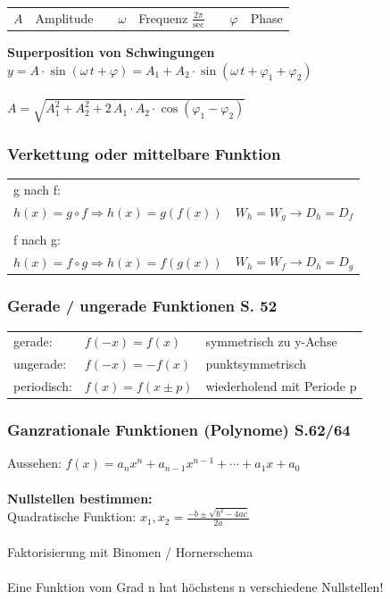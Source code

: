 			\begin{tabular}{llllllll}
				$A$ & Amplitude & & $\omega$ & Frequenz $\frac{2 \pi}{\mathrm{sec}}$ & & $\varphi$ & Phase \\
			\end{tabular}			
			
			\textbf{Superposition von Schwingungen} \\
			$y = A \cdot \sin(\omega \, t + \varphi)  =  A_1 + A_2 \cdot \sin(\omega \, t + \varphi_1 + \varphi_2)$\\ 
			\\
			$A = \sqrt{A_1^2 + A_2^2 + 2 \,A_1 \cdot A_2 \cdot \cos(\varphi_1 - \varphi_2)}$
			
		\subsubsection{Verkettung oder mittelbare Funktion}
			\begin{tabular}{ll} %
				g nach f: & \\
				$h(x)=g \circ f \Rightarrow h(x)=g(f(x))$ & $W_h=W_g \rightarrow D_h=D_f$ \\
				\\
				f nach g: \\
				$h(x)=f \circ g \Rightarrow h(x)=f(g(x))$ & $W_h=W_f \rightarrow D_h=D_g$ \\				
			\end{tabular}
			
		\subsubsection{Gerade / ungerade Funktionen S. 52}
			\begin{tabular}{lll} 
				 gerade:     & $f(-x) = f(x)$      & symmetrisch zu y-Achse \\
				 ungerade:   & $f(-x) = -f(x)$     & punktsymmetrisch \\
				 periodisch: & $f(x) = f(x \pm p)$ & wiederholend mit Periode p \\								
			\end{tabular}			
				
		\subsubsection{Ganzrationale Funktionen (Polynome) S.62/64}
			Aussehen: $f(x)=a_nx^{n}+a_{n-1}x^{n-1}+\cdots+a_1x+a_0$\\
			\\
			\textbf{Nullstellen bestimmen:} \\
			Quadratische Funktion: $x_1 , x_2 = \frac{-b \pm \sqrt{b^2 - 4ac}}{2a}$ \\
			\\
			Faktorisierung mit Binomen / Hornerschema \\
			\\
			Eine Funktion vom Grad n hat höchstens n verschiedene Nullstellen!
			
